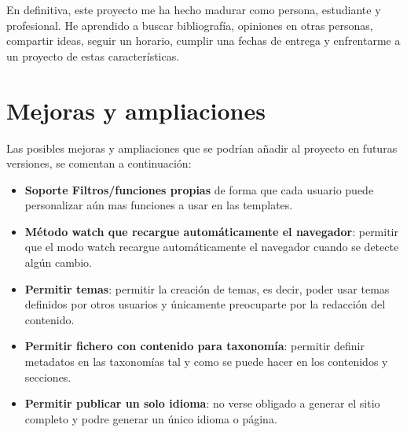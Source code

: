 En definitiva, este proyecto me ha hecho madurar como persona, estudiante y profesional. He aprendido a buscar
bibliografía, opiniones en otras personas, compartir ideas, seguir un horario, cumplir una fechas de
entrega y enfrentarme a un proyecto de estas características.

\section{Mejoras y ampliaciones}

Las posibles mejoras y ampliaciones que se podrían añadir al proyecto en futuras versiones, se comentan
a continuación:

\begin{itemize}
    \item \textbf{Soporte Filtros/funciones propias} de forma que cada usuario puede personalizar aún mas
    funciones a usar en las templates.
    \item \textbf{Método watch que recargue automáticamente el navegador}: permitir que el modo watch recargue
    automáticamente el navegador cuando se detecte algún cambio.
    \item \textbf{Permitir temas}: permitir la creación de temas, es decir, poder usar temas definidos
    por otros usuarios y únicamente preocuparte por la redacción del contenido.
    \item \textbf{Permitir fichero con contenido para taxonomía}: permitir definir metadatos en las taxonomías
    tal y como se puede hacer en los contenidos y secciones.
    \item \textbf{Permitir publicar un solo idioma}: no verse obligado a generar el sitio completo y podre generar
    un único idioma o página.
\end{itemize}
